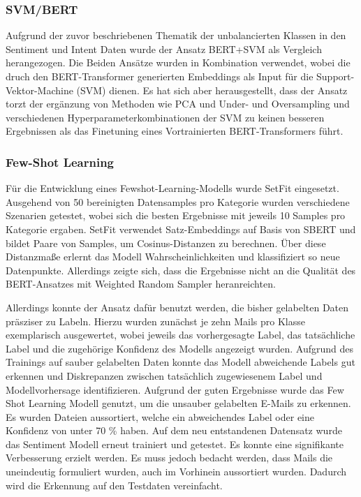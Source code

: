 \subsubsection{SVM/BERT}

Aufgrund der zuvor beschriebenen Thematik der unbalancierten Klassen in den Sentiment und
Intent Daten wurde der Ansatz BERT+SVM als Vergleich herangezogen. Die Beiden Ansätze wurden
in Kombination verwendet, wobei die druch den BERT-Transformer generierten Embeddings als Input
für die Support-Vektor-Machine (SVM) dienen. Es hat sich aber herausgestellt, dass der Ansatz
torzt der ergänzung von Methoden wie PCA und Under- und Oversampling und verschiedenen
Hyperparameterkombinationen der SVM zu keinen besseren Ergebnissen als das Finetuning eines
Vortrainierten BERT-Transformers führt.  


\subsubsection{Few-Shot Learning}

Für die Entwicklung eines Fewshot-Learning-Modells wurde SetFit eingesetzt. Ausgehend von
50 bereinigten Datensamples pro Kategorie wurden verschiedene Szenarien getestet, wobei sich
die besten Ergebnisse mit jeweils 10 Samples pro Kategorie ergaben. SetFit verwendet
Satz-Embeddings auf Basis von SBERT und bildet Paare von Samples, um Cosinus-Distanzen zu
berechnen. Über diese Distanzmaße erlernt das Modell Wahrscheinlichkeiten und klassifiziert so
neue Datenpunkte. Allerdings zeigte sich, dass die Ergebnisse nicht an die Qualität des
BERT-Ansatzes mit Weighted Random Sampler heranreichten.

Allerdings konnte der Ansatz dafür benutzt werden, die bisher gelabelten Daten präsziser zu Labeln. 
Hierzu wurden zunächst je zehn Mails pro Klasse exemplarisch ausgewertet, wobei jeweils das vorhergesagte 
Label, das tatsächliche Label und die zugehörige Konfidenz des Modells angezeigt wurden. Aufgrund des 
Trainings auf sauber gelabelten Daten konnte das Modell abweichende Labels gut erkennen und Diskrepanzen 
zwischen tatsächlich zugewiesenem Label und Modellvorhersage identifizieren. Aufgrund der guten Ergebnisse
wurde das Few Shot Learning Modell genutzt, um die unsauber gelabelten E-Mails zu erkennen. 
Es wurden Dateien aussortiert, welche ein abweichendes Label oder eine Konfidenz von unter 70 \% haben.   
Auf dem neu entstandenen Datensatz wurde das Sentiment Modell erneut trainiert und getestet. Es 
konnte eine signifikante Verbesserung erzielt werden. Es muss jedoch bedacht werden, dass Mails die 
uneindeutig formuliert wurden, auch im Vorhinein aussortiert wurden. Dadurch wird die Erkennung auf den 
Testdaten vereinfacht. 
 
